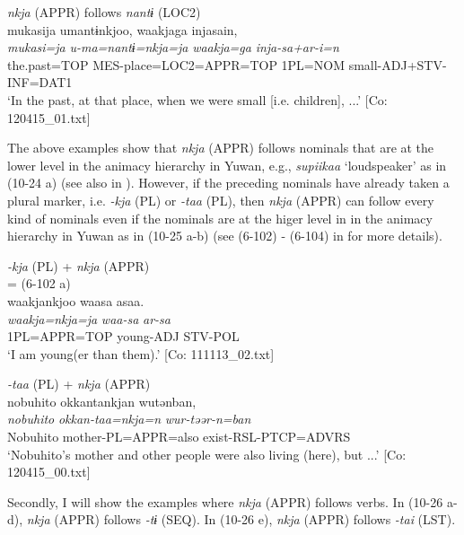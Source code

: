    \ex\textit{nkja} (APPR) follows \textit{nantɨ} (LOC2)\\
      \glll    mukasija  umantɨnkjoo,  waakjaga   injasain,\\
      \textit{mukasi=ja}  \textit{u-ma=nantɨ=nkja=ja}  \textit{waakja=ga}   \textit{inja-sa+ar-i=n}\\
      the.past=TOP  MES-place=LOC2=APPR=TOP  1PL=NOM  small-ADJ+STV-INF=DAT1\\
      \glt       ‘In the past, at that place, when we were small [i.e. children], ...’ [Co: 120415\_01.txt]
    \z
\z

The above examples show that \textit{nkja} (APPR) follows nominals that are at the lower level in the animacy hierarchy in Yuwan, e.g., \textit{supiikaa} ‘loudspeaker’ as in (10-24 a) (see also  in ). However, if the preceding nominals have already taken a plural marker, i.e. \textit{{}-kja} (PL) or \textit{{}-taa} (PL), then \textit{nkja} (APPR) can follow every kind of nominals even if the nominals are at the higer level in in the animacy hierarchy in Yuwan as in (10-25 a-b) (see (6-102) - (6-104) in  for more details).

\ea\label{ex:10.25}
\ea  \textit{{}-kja} (PL) + \textit{nkja} (APPR)\\ = (6-102 a)\\
      \glll    waakjankjoo  waasa  asaa.\\
    \textit{waakja=nkja=ja}  \textit{waa-sa}  \textit{ar-sa}\\
    1PL=APPR=TOP  young-ADJ  STV-POL\\
\glt     ‘I am young(er than them).’  [Co: 111113\_02.txt]

 \ex\textit{{}-taa} (PL) + \textit{nkja} (APPR)\\
      \glll    nobuhito  okkantankjan  wutənban,\\
    \textit{nobuhito}  \textit{okkan-taa=nkja=n}  \textit{wur-təər-n=ban}\\
    Nobuhito  mother-PL=APPR=also  exist-RSL-PTCP=ADVRS\\
\glt     ‘Nobuhito’s mother and other people were also living (here), but ...’  [Co: 120415\_00.txt]
\z
\z

  Secondly, I will show the examples where \textit{nkja} (APPR) follows verbs. In (10-26 a-d), \textit{nkja} (APPR) follows \textit{{}-tɨ} (SEQ). In (10-26 e), \textit{nkja} (APPR) follows \textit{-tai} (LST).

